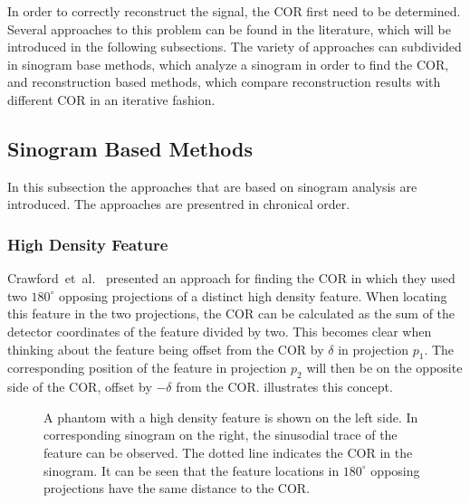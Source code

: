 \documentclass[10pt,journal,compsoc]{IEEEtran}
\begin{document}
In order to correctly reconstruct the signal, the COR first need to be determined.
Several approaches to this problem can be found in the literature, which will be introduced in the following subsections.
The variety of approaches can subdivided in sinogram base methods, which analyze a sinogram in order to find the COR, and reconstruction based methods, which compare reconstruction results with different COR in an iterative fashion.

\subsection{Sinogram Based Methods}
In this subsection the approaches that are based on sinogram analysis are introduced.
The approaches are presentred in chronical order.

\subsubsection{High Density Feature}
Crawford~et~al.~\cite{crawford1988} presented an approach for finding the COR in which they used two $180^\circ$ opposing projections of a distinct high density feature.
When locating this feature in the two projections, the COR can be calculated as the sum of the detector coordinates of the feature divided by two.
This becomes clear when thinking about the feature being offset from the COR by $\delta$ in projection $p_1$.
The corresponding position of the feature in projection $p_2$ will then be on the opposite side of the COR, offset by $-\delta$ from the COR.  illustrates this concept.
%
\begin{figure}[!h]
\centering
{}
\hfil
{}
\caption{
A phantom with a high density feature is shown on the left side.
In corresponding sinogram on the right, the sinusodial trace of the feature can be observed.
The dotted line indicates the COR in the sinogram.
It can be seen that the feature locations in $180^\circ$ opposing projections have the same distance to the COR.  
}
\label{fig:highdenistyfeature}
\end{figure}
%
\end{document}
